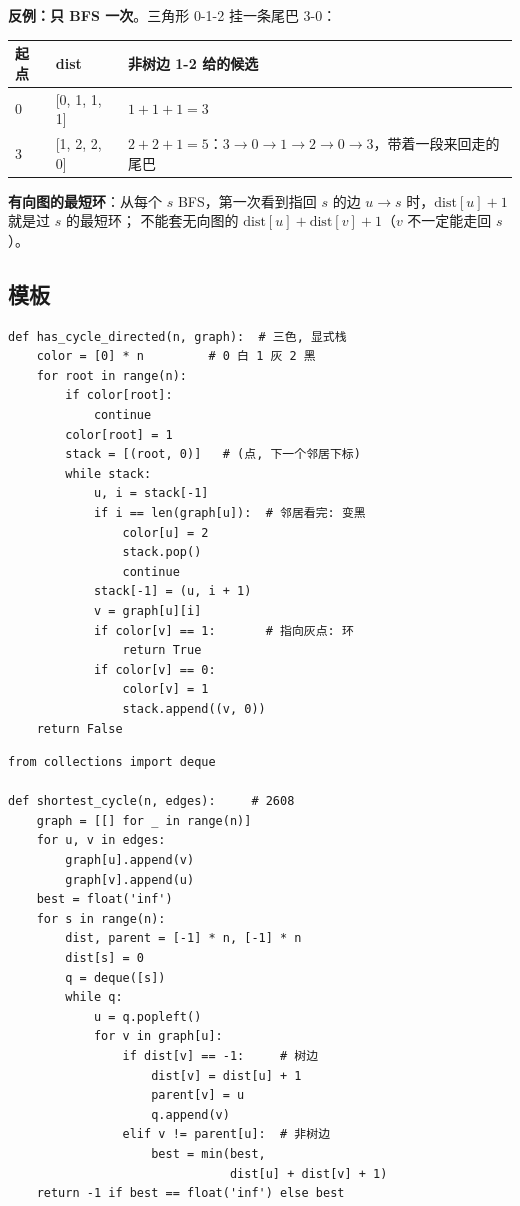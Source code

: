 \textbf{反例：只 BFS 一次}。三角形 0-1-2 挂一条尾巴 3-0：

\begin{center}\small
\begin{tabular}{@{}l l l@{}}
\toprule
\textbf{起点} & \textbf{dist} & \textbf{非树边 1-2 给的候选}\\
\midrule
0 & [0, 1, 1, 1] & $1 + 1 + 1 = 3$\\
3 & [1, 2, 2, 0] & $2 + 2 + 1 = 5$：$3 \to 0 \to 1 \to 2 \to 0 \to 3$，带着一段来回走的尾巴\\
\bottomrule
\end{tabular}
\end{center}

\textbf{有向图的最短环}：从每个 $s$ BFS，第一次看到指回 $s$ 的边 $u \to s$ 时，$\text{dist}[u] + 1$ 就是过 $s$ 的最短环；
不能套无向图的 $\text{dist}[u] + \text{dist}[v] + 1$（$v$ 不一定能走回 $s$）。

\subsection{模板}

\begin{minipage}[t]{0.49\linewidth}
\begin{lstlisting}
def has_cycle_directed(n, graph):  # 三色, 显式栈
    color = [0] * n         # 0 白 1 灰 2 黑
    for root in range(n):
        if color[root]:
            continue
        color[root] = 1
        stack = [(root, 0)]   # (点, 下一个邻居下标)
        while stack:
            u, i = stack[-1]
            if i == len(graph[u]):  # 邻居看完: 变黑
                color[u] = 2
                stack.pop()
                continue
            stack[-1] = (u, i + 1)
            v = graph[u][i]
            if color[v] == 1:       # 指向灰点: 环
                return True
            if color[v] == 0:
                color[v] = 1
                stack.append((v, 0))
    return False
\end{lstlisting}
\end{minipage}\hfill
\begin{minipage}[t]{0.49\linewidth}
\begin{lstlisting}
from collections import deque

def shortest_cycle(n, edges):     # 2608
    graph = [[] for _ in range(n)]
    for u, v in edges:
        graph[u].append(v)
        graph[v].append(u)
    best = float('inf')
    for s in range(n):
        dist, parent = [-1] * n, [-1] * n
        dist[s] = 0
        q = deque([s])
        while q:
            u = q.popleft()
            for v in graph[u]:
                if dist[v] == -1:     # 树边
                    dist[v] = dist[u] + 1
                    parent[v] = u
                    q.append(v)
                elif v != parent[u]:  # 非树边
                    best = min(best,
                               dist[u] + dist[v] + 1)
    return -1 if best == float('inf') else best
\end{lstlisting}
\end{minipage}

